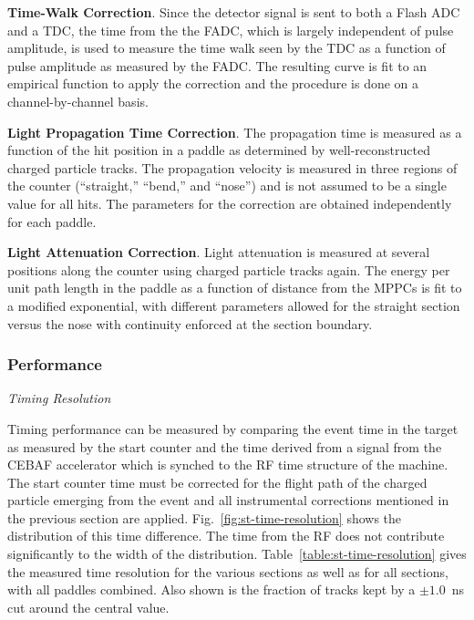 \begin{description}
\item{\bf Time-Walk Correction}. Since the detector signal is sent to
  both a Flash ADC and a TDC, the time from the the FADC, which is
  largely independent of pulse amplitude, is used to measure the time
  walk seen by the TDC as a function of pulse amplitude as measured by
  the FADC. The resulting curve is fit to an empirical function to
  apply the correction and the procedure is done on a
  channel-by-channel basis.
\item{\bf Light Propagation Time Correction}. The propagation time is
  measured as a function of the hit position in a paddle as determined
  by well-reconstructed charged particle tracks. The propagation
  velocity is measured in three regions of the counter (``straight,''
  ``bend,'' and ``nose'') and is not assumed to be a single value for
  all hits. The parameters for the correction are obtained
  independently for each paddle.
\item{\bf Light Attenuation Correction}. Light attenuation is measured
  at several positions along the counter using charged particle tracks
  again. The energy per unit path length in the paddle as a function
  of distance from the MPPCs is fit to a modified exponential, with
  different parameters allowed for the straight section versus the
  nose with continuity enforced at the section boundary.
\end{description}

\subsubsection{Performance}

\smallskip

{\it Timing Resolution}

\smallskip

Timing performance can be measured by comparing the event time in the
target as measured by the start counter and the time derived from a
signal from the CEBAF accelerator which is synched to the RF time
structure of the machine. The start counter time must be corrected for
the flight path of the charged particle emerging from the event and
all instrumental corrections mentioned in the previous section are
applied. Fig.~\ref{fig:st-time-resolution} shows the distribution of
this time difference. The time from the RF does not contribute
significantly to the width of the
distribution. Table~\ref{table:st-time-resolution} gives the measured
time resolution for the various sections as well as for all sections,
with all paddles combined. Also shown is the fraction of tracks kept
by a $\pm 1.0$~ns cut around the central value.

